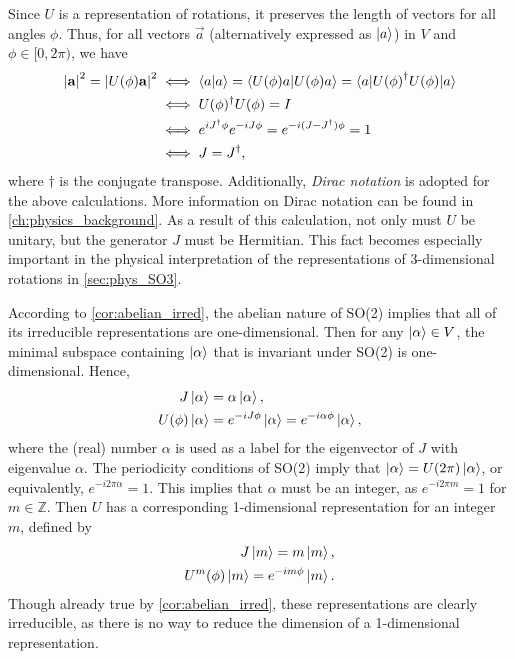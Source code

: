 Since $U$ is a representation of rotations, it preserves the length of vectors for all angles $\phi$. Thus, for all vectors $\vec{a}$ (alternatively expressed as $\ket{a}$) in $V$ and $\phi\in[0,2\pi)$, we have
\begin{align*}
    \left|\mathbf{a}\right|^2 = \left|U(\phi)\mathbf{a}\right|^2
    &\iff \braket{a|a} = \braket{U(\phi)a|U(\phi)a} = \braket{a|{U(\phi)}^\dagger U(\phi)|a} \\
    &\iff U(\phi)^\dagger U(\phi) = I \\
    &\iff e^{iJ^\dagger\phi}e^{-iJ\phi} = e^{-i(J-J^\dagger)\phi} = 1 \\
    &\iff J = J^\dagger,
\end{align*}
where $\dagger$ is the conjugate transpose. Additionally, \textit{Dirac notation} is adopted for the above calculations. More information on Dirac notation can be found in \cref{ch:physics_background}. As a result of this calculation, not only must $U$ be unitary, but the generator $J$ must be Hermitian. This fact becomes especially important in the physical interpretation of the representations of 3-dimensional rotations in \cref{sec:phys_SO3}.

According to \cref{cor:abelian_irred}, the abelian nature of SO(2) implies that all of its irreducible representations are one-dimensional. Then for any $\ket{\alpha}\in V$, the minimal subspace containing $\ket{\alpha}$ that is invariant under SO(2) is one-dimensional. Hence,
\begin{align*}
    J\ket{\alpha} &= \alpha\ket{\alpha}, \\
    U(\phi)\ket{\alpha} &= e^{-iJ\phi}\ket{\alpha} = e^{-i\alpha\phi}\ket{\alpha},
\end{align*}
where the (real) number $\alpha$ is used as a label for the eigenvector of $J$ with eigenvalue $\alpha$. The periodicity conditions of SO(2) imply that $\ket{\alpha} = U(2\pi)\ket{\alpha}$, or equivalently, $e^{-i2\pi\alpha} = 1$. This implies that $\alpha$ must be an integer, as $e^{-i2\pi m} = 1$ for $m\in\mathbb{Z}$. Then $U$ has a corresponding 1-dimensional representation for an integer $m$, defined by
\begin{align*}
    J\ket{m} = m\ket{m}, \\
    U^m(\phi)\ket{m} = e^{-im\phi}\ket{m}.
\end{align*}
Though already true by \cref{cor:abelian_irred}, these representations are clearly irreducible, as there is no way to reduce the dimension of a 1-dimensional representation.

